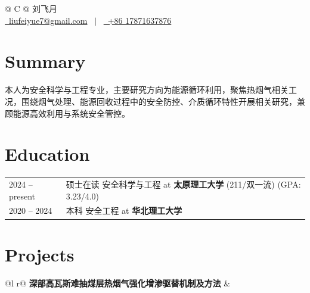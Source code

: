 \documentclass[a4paper,12pt]{article}
\begin{document}
\pagestyle{empty}

\begin{tabularx}{\linewidth}{@{} C @{}}
\Huge{刘飞月} \\[7.5pt]
\href{mailto:liufeiyue7@gmail.com}{\raisebox{-0.05\height}\faEnvelope \ liufeiyue7@gmail.com} \ $|$ \
\href{tel:+8617871637876}{\raisebox{-0.05\height}\faMobile \ +86 17871637876}
\end{tabularx}

\section{Summary}
本人为安全科学与工程专业，主要研究方向为能源循环利用，聚焦热烟气相关工况，围绕烟气处理、能源回收过程中的安全防控、介质循环特性开展相关研究，兼顾能源高效利用与系统安全管控。

\section{Education}
\begin{tabularx}{\linewidth}{@{}l X@{}}
2024 -- present & 硕士在读 安全科学与工程 at \textbf{太原理工大学} (211/双一流) \hfill \normalsize (GPA: 3.23/4.0) \\
2020 -- 2024 & 本科 安全工程 at \textbf{华北理工大学}
\end{tabularx}

\section{Projects}
\begin{tabularx}{\linewidth}{ @{}l r@{} }
\textbf{深部高瓦斯难抽煤层热烟气强化增渗驱替机制及方法} & \hfill \\[3.75pt]
 \\
\end{tabularx}
\end{document}
